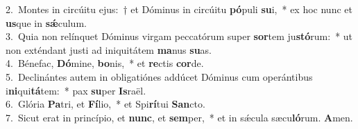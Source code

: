 {2.~}Montes in circúitu ejus:~† et Dóminus in circúitu \textbf{pó}puli \textbf{su}i,~* ex hoc nunc et \textbf{us}que in \textbf{sǽ}culum.\\
{3.~}Quia non relínquet Dóminus virgam peccatórum super \textbf{sor}tem ju\textbf{stó}rum:~* ut non exténdant justi ad iniquitátem \textbf{ma}nus \textbf{su}as.\\
{4.~}Bénefac, \textbf{Dó}mine, \textbf{bo}nis,~* et \textbf{re}ctis \textbf{cor}de.\\
{5.~}Declinántes autem in obligatiónes addúcet Dóminus cum operántibus i\textbf{ni}qui\textbf{tá}tem:~* pax \textbf{su}per \textbf{Is}raël.\\
{6.~}Glória \textbf{Pa}tri, et \textbf{Fí}lio,~* et Spi\textbf{rí}tui \textbf{San}cto.\\
{7.~}Sicut erat in princípio, et \textbf{nunc}, et \textbf{sem}per,~* et in sǽcula sæcu\textbf{ló}rum. \textbf{A}men.\\

